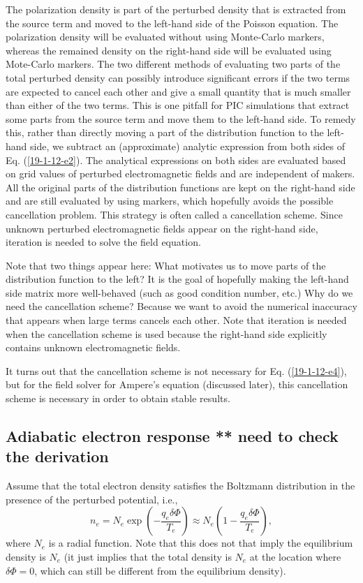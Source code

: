 \documentclass{article}
\begin{document}
The polarization density is part of the perturbed density that is extracted
from the source term and moved to the left-hand side of the Poisson equation.
The polarization density will be evaluated without using Monte-Carlo markers,
whereas the remained density on the right-hand side will be evaluated using
Mote-Carlo markers. The two different methods of evaluating two parts of the
total perturbed density can possibly introduce significant errors if the two
terms are expected to cancel each other and give a small quantity that is much
smaller than either of the two terms. This is one pitfall for PIC simulations
that extract some parts from the source term and move them to the left-hand
side. To remedy this, rather than directly moving a part of the distribution
function to the left-hand side, we subtract an (approximate) analytic
expression from both sides of Eq. (\ref{19-1-12-e2}). The analytical
expressions on both sides are evaluated based on grid values of perturbed
electromagnetic fields and are independent of makers. All the original parts
of the distribution functions are kept on the right-hand side and are still
evaluated by using markers, which hopefully avoids the possible cancellation
problem. This strategy is often called a cancellation scheme. Since unknown
perturbed electromagnetic fields appear on the right-hand side, iteration is
needed to solve the field equation.

Note that two things appear here: What motivates us to move parts of the
distribution function to the left? It is the goal of hopefully making the
left-hand side matrix more well-behaved (such as good condition number, etc.)
Why do we need the cancellation scheme? Because we want to avoid the numerical
inaccuracy that appears when large terms cancels each other. Note that
iteration is needed when the cancellation scheme is used because the
right-hand side explicitly contains unknown electromagnetic fields.

It turns out that the cancellation scheme is not necessary for Eq.
(\ref{19-1-12-e4}), but for the field solver for Ampere's equation (discussed
later), this cancellation scheme is necessary in order to obtain stable
results.

\subsection{Adiabatic electron response ** need to check the derivation}

Assume that the total electron density satisfies the Boltzmann distribution in
the presence of the perturbed potential, i.e.,
\begin{equation}
  \label{23-2-13-1} n_e = N_e \exp \left( - \frac{q_e \delta \Phi}{T_e}
  \right) \approx N_e \left( 1 - \frac{q_e \delta \Phi}{T_e} \right),
\end{equation}
where $N_e$ is a radial function. Note that this does not that imply the
equilibrium density is $N_e$ (it just implies that the total density is $N_e$
at the location where $\delta \Phi = 0$, which can still be different from the
equilibrium density).
\end{document}
